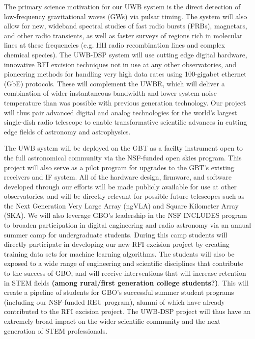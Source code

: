 \documentclass[10pt]{myNSF}
\begin{document}
The primary science motivation for our UWB system is the direct
detection of low-frequency gravitational waves (GWs) via pulsar
timing.  The system will also allow for new, wideband spectral studies
of fast radio bursts (FRBs), magnetars, and other radio transients, as
well as faster surveys of regions rich in molecular lines at these
frequencies (e.g. H{\sc II} radio recombination lines and complex
chemical species).  The UWB-DSP system will use cutting edge digital
hardware, innovative RFI excision techniques not in use at any other
observatories, and pioneering methods for handling very high data
rates using 100-gigabet ethernet (GbE) protocols.  These will
complement the UWBR, which will deliver a combination of wider
instantaneous bandwidth and lower system noise temperature than was
possible with previous generation technology.  Our project will thus
pair advanced digital and analog technologies for the world's largest
single-dish radio telescope to enable transformative scientific
advances in cutting edge fields of astronomy and astrophysics.

The UWB system will be deployed on the GBT as a facilty instrument
open to the full astronomical community via the NSF-funded open skies
program.  This project will also serve as a pilot program for upgrades
to the GBT's existing receivers and IF system.  All of the hardware
design, firmware, and software developed through our efforts will be
made publicly available for use at other observatories, and will be
directly relevant for possible future telescopes such as the Next
Generation Very Large Array (ngVLA) and Square Kilometer Array (SKA).
We will also leverage GBO's leadership in the NSF INCLUDES program to
broaden participation in digital engineering and radio astronomy via
an annual summer camp for undergraduate students.  During this camp
students will directly participate in developing our new RFI excision
project by creating training data sets for machine learning
algorithms.  The students will also be exposed to a wide range of
engineering and scientific disciplines that contribute to the success
of GBO, and will receive interventions that will increase retention in
STEM fields \textbf{(among rural/first generation college students?)}.
This will create a pipeline of students for GBO's successful summer
student programs (including our NSF-funded REU program), alumni of
which have already contributed to the RFI excision project.  The
UWB-DSP project will thus have an extremely broad impact on the wider
scientific community and the next generation of STEM professionals.
\end{document}
